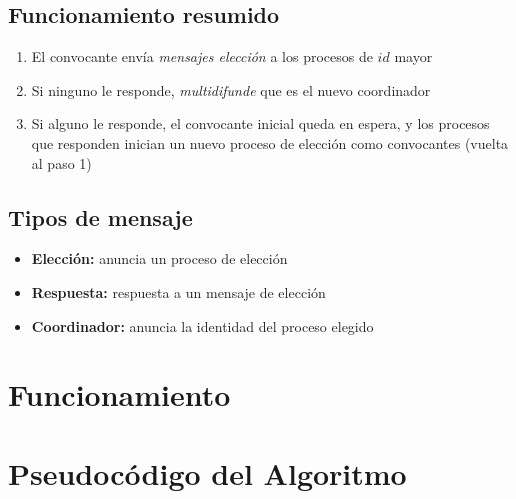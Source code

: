 \documentclass[a4paper,12pt]{article}
\begin{document}
\subsection*{Funcionamiento resumido}

\begin{enumerate}
    \item El convocante envía \textit{mensajes elección} a los procesos de $id$ mayor
    \item Si ninguno le responde, \textit{multidifunde} que es el nuevo coordinador
    \item Si alguno le responde, el convocante inicial queda en espera, y los procesos que responden
         inician un nuevo proceso de elección como convocantes (vuelta al paso 1)
\end{enumerate}

\subsection*{Tipos de mensaje}

\begin{itemize}
    \item \textbf{Elección:} anuncia un proceso de elección
    \item \textbf{Respuesta:} respuesta a un mensaje de elección
    \item \textbf{Coordinador:} anuncia la identidad del proceso elegido
\end{itemize}


\section*{Funcionamiento}



\section*{Pseudocódigo del Algoritmo}
\end{document}
